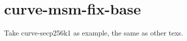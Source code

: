 \section{curve-msm-fix-base}
\label{curve-msm-fix-base}

Take curve-secp256k1 as example, the same as other texs.
